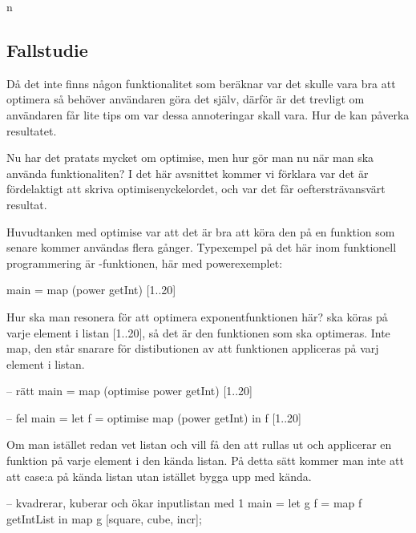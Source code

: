 n\documentclass[../Optimise]{subfiles}
\begin{document}
\subsection{Fallstudie}


Då det inte finns någon funktionalitet som beräknar var det skulle vara
bra att optimera så behöver användaren göra det själv, därför är det trevligt om
användaren får lite tips om var dessa annoteringar skall vara. Hur de kan påverka
resultatet.


Nu har det pratats mycket om optimise, men hur gör man nu när man ska använda
funktionaliten? I det här avsnittet kommer vi förklara var det är fördelaktigt
att skriva optimisenyckelordet, och var det får oeftersträvansvärt resultat.



Huvudtanken med optimise var att det är bra att köra den på en funktion
som senare kommer användas flera gånger. Typexempel på det här inom
funktionell programmering är -funktionen, här med powerexemplet:

\begin{codeEx}
main = map (power getInt) [1..20]
\end{codeEx}

Hur ska man resonera för att optimera exponentfunktionen här?
 ska köras på varje element i listan [1..20], så det 
är den funktionen som ska optimeras. Inte map, den står snarare för
distibutionen av att funktionen appliceras på varj element i listan.
\begin{codeEx}
-- rätt
main = map (optimise power getInt) [1..20]

-- fel
main = let f = optimise map (power getInt)
       in  f [1..20]
\end{codeEx}



Om man istället redan vet listan och vill få den att rullas ut och applicerar en
funktion på varje element i den kända listan. På detta sätt kommer man inte att 
att case:a på kända listan utan istället bygga upp med kända.
\begin{codeEx}
-- kvadrerar, kuberar och ökar inputlistan med 1
main = let g f = map f getIntList
       in  map g [square, cube, incr];
\end{codeEx}
\end{document}
